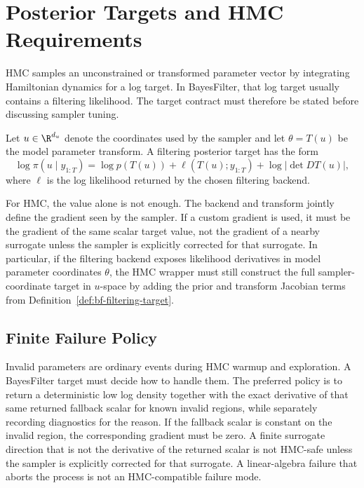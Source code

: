 \chapter{Posterior Targets and HMC Requirements}
\label{ch:bf-hmc-target-requirements}

HMC samples an unconstrained or transformed parameter vector by integrating
Hamiltonian dynamics for a log target.  In BayesFilter, that log target usually
contains a filtering likelihood.  The target contract must therefore be stated
before discussing sampler tuning.

\begin{definition}
\label{def:bf-filtering-target}
Let $u \in \R^{d_u}$ denote the coordinates used by the sampler and let
$\theta = T(u)$ be the model parameter transform.  A filtering posterior target
has the form
\[
  \log \pi(u \mid y_{1:T})
  =
  \log p(T(u))
  + \ell(T(u); y_{1:T})
  + \log\left|\det DT(u)\right|,
\]
where $\ell$ is the log likelihood returned by the chosen filtering backend.
\end{definition}

For HMC, the value alone is not enough.  The backend and transform jointly
define the gradient seen by the sampler.  If a custom gradient is used, it must
be the gradient of the same scalar target value, not the gradient of a nearby
surrogate unless the sampler is explicitly corrected for that surrogate.  In
particular, if the filtering backend exposes likelihood derivatives in model
parameter coordinates \(\theta\), the HMC wrapper must still construct the full
sampler-coordinate target in \(u\)-space by adding the prior and transform
Jacobian terms from Definition~\ref{def:bf-filtering-target}.

\section{Finite Failure Policy}
\label{sec:bf-finite-failure-policy}

Invalid parameters are ordinary events during HMC warmup and exploration.  A
BayesFilter target must decide how to handle them.  The preferred policy is to
return a deterministic low log density together with the exact derivative of that
same returned fallback scalar for known invalid regions, while separately
recording diagnostics for the reason.  If the fallback scalar is constant on the
invalid region, the corresponding gradient must be zero.  A finite surrogate
direction that is not the derivative of the returned scalar is not HMC-safe
unless the sampler is explicitly corrected for that surrogate.  A linear-algebra
failure that aborts the process is not an HMC-compatible failure mode.

